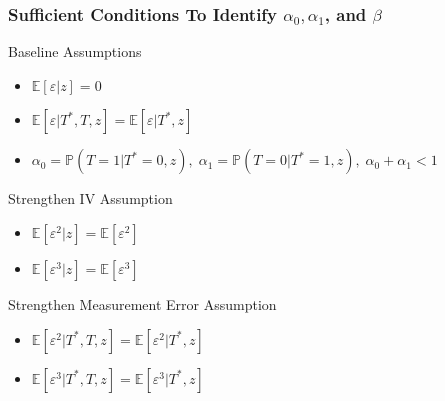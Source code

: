 \documentclass{beamer}
\begin{document}
\begin{frame}
  \frametitle{Sufficient Conditions To Identify $\alpha_0, \alpha_1$, and $\beta$}
  \small

  \begin{block}{Baseline Assumptions}
  \vspace{-1em}
    \begin{itemize}
      \item $\mathbb{E}[\varepsilon|z] =0$
      \item $\mathbb{E}[\varepsilon|T^*,T,z] = \mathbb{E}[\varepsilon|T^*,z]$
      \item $\alpha_0 = \mathbb{P}(T=1|T^*=0,z), \; \alpha_1 =\mathbb{P}(T=0|T^*=1, z), \; \alpha_0 + \alpha_1 < 1$
    \end{itemize}
  \end{block}

  \vspace{-1em}
  
  \begin{alertblock}{Strengthen IV Assumption}
  \vspace{-1em}
    \begin{itemize}
      \item $\mathbb{E}[\varepsilon^2|z] = \mathbb{E}[\varepsilon^2]$  
      \item $\mathbb{E}[\varepsilon^3|z] = \mathbb{E}[\varepsilon^3]$  
    \end{itemize}
  \end{alertblock}

  \vspace{-1em}
  \begin{alertblock}{Strengthen Measurement Error Assumption}
  \vspace{-1em}
    \begin{itemize}
      \item $\mathbb{E}[\varepsilon^2|T^*,T,z] = \mathbb{E}[\varepsilon^2|T^*,z]$  
      \item $\mathbb{E}[\varepsilon^3|T^*,T,z] = \mathbb{E}[\varepsilon^3|T^*,z]$  
    \end{itemize}

  \end{alertblock}

\end{frame}
\end{document}
